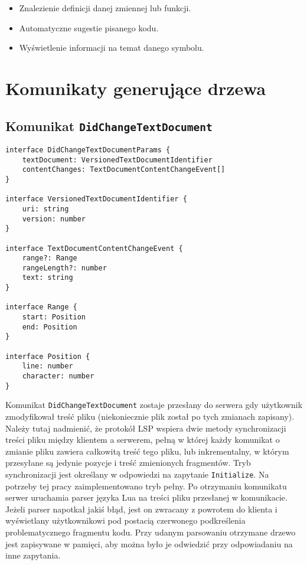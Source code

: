 \begin{itemize}
    \item Znalezienie definicji danej zmiennej lub funkcji.
    \item Automatyczne sugestie pisanego kodu.
    \item Wyświetlenie informacji na temat danego symbolu.
\end{itemize}

\section{Komunikaty generujące drzewa}
\subsection{Komunikat \texttt{DidChangeTextDocument}}
\begin{lstlisting}[title=Struktura argumentu komunikatu]
interface DidChangeTextDocumentParams {
    textDocument: VersionedTextDocumentIdentifier
    contentChanges: TextDocumentContentChangeEvent[]
}

interface VersionedTextDocumentIdentifier {
    uri: string
    version: number
}

interface TextDocumentContentChangeEvent {
    range?: Range
    rangeLength?: number
    text: string
}

interface Range {
    start: Position
    end: Position
}

interface Position {
    line: number
    character: number
}
\end{lstlisting}

Komunikat \texttt{DidChangeTextDocument} zostaje przesłany do serwera gdy użytkownik zmodyfikował treść pliku (niekoniecznie plik został po tych zmianach zapisany). Należy tutaj nadmienić, że protokół LSP wspiera dwie metody synchronizacji treści pliku między klientem a serwerem, pełną w której każdy komunikat o zmianie pliku zawiera całkowitą treść tego pliku, lub inkrementalny, w którym przesyłane są jedynie pozycje i treść zmienionych fragmentów. Tryb synchronizacji jest określany w odpowiedzi na zapytanie \texttt{Initialize}. Na potrzeby tej pracy zaimplementowano tryb pełny. Po otrzymaniu komunikatu serwer uruchamia parser języka Lua na treści pliku przesłanej w komunikacie. Jeżeli parser napotkał jakiś błąd, jest on zwracany z powrotem do klienta i wyświetlany użytkownikowi pod postacią czerwonego podkreślenia problematycznego fragmentu kodu. Przy udanym parsowaniu otrzymane drzewo jest zapisywane w pamięci, aby można było je odwiedzić przy odpowiadaniu na inne zapytania.


